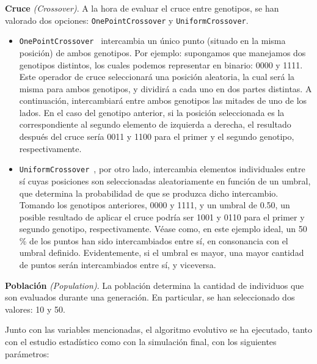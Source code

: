 \textbf{Cruce} \textit{(Crossover)}. A la hora de evaluar el cruce entre genotipos, se han valorado dos opciones: \texttt{OnePointCrossover} y \texttt{UniformCrossover}.

\begin{itemize}
    \item \texttt{OnePointCrossover}~\cite{eiben_422_2003} intercambia un único punto (situado en la misma posición) de ambos genotipos. Por ejemplo: supongamos que manejamos dos genotipos distintos, los cuales podemos representar en binario: 0000 y 1111. Este operador de cruce seleccionará una posición aleatoria, la cual será la misma para ambos genotipos, y dividirá a cada uno en dos partes distintas. A continuación, intercambiará entre ambos genotipos las mitades de uno de los lados. En el caso del genotipo anterior, si la posición seleccionada es la correspondiente al segundo elemento de izquierda a derecha, el resultado después del cruce sería 0011 y 1100 para el primer y el segundo genotipo, respectivamente.
    \item \texttt{UniformCrossover}~\cite{eiben_422_2003}, por otro lado, intercambia elementos individuales entre sí cuyas posiciones son seleccionadas aleatoriamente en función de un umbral, que determina la probabilidad de que se produzca dicho intercambio. Tomando los genotipos anteriores, 0000 y 1111, y un umbral de 0.50, un posible resultado de aplicar el cruce podría ser 1001 y 0110 para el primer y segundo genotipo, respectivamente. Véase como, en este ejemplo ideal, un 50 \% de los puntos han sido intercambiados entre sí, en consonancia con el umbral definido. Evidentemente, si el umbral es mayor, una mayor cantidad de puntos serán intercambiados entre sí, y viceversa.
\end{itemize}

\textbf{Población} \textit{(Population)}. La población determina la cantidad de individuos que son evaluados durante una generación. En particular, se han seleccionado dos valores: 10 y 50.

Junto con las variables mencionadas, el algoritmo evolutivo se ha ejecutado, tanto con el estudio estadístico como con la simulación final, con los siguientes parámetros:

